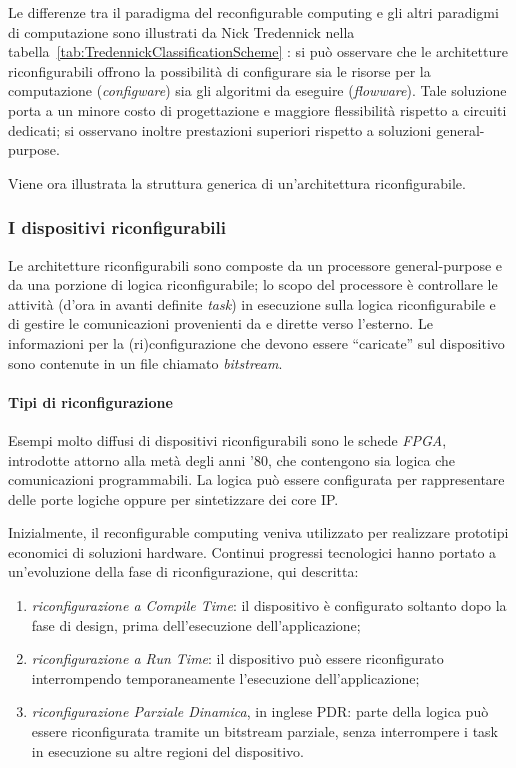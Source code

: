 Le differenze tra il paradigma del reconfigurable computing e gli altri paradigmi di
computazione sono illustrati da Nick Tredennick nella
tabella~\ref{tab:TredennickClassificationScheme} \cite{TredennickClassification}: si può
osservare che le architetture riconfigurabili offrono la possibilità di configurare sia le
risorse per la computazione (\emph{configware}) sia gli algoritmi da eseguire
(\emph{flowware}). Tale soluzione porta a un minore costo di progettazione e
maggiore flessibilità rispetto a circuiti dedicati; si osservano inoltre prestazioni
superiori rispetto a soluzioni general-purpose.

Viene ora illustrata la struttura generica di un'architettura riconfigurabile.

\subsubsection{I dispositivi riconfigurabili}
Le architetture riconfigurabili sono composte da un processore general-purpose e da una
porzione di logica riconfigurabile; lo scopo del processore è controllare le
attività (d'ora in avanti definite \emph{task}) in esecuzione sulla logica
riconfigurabile e di gestire le comunicazioni provenienti da e dirette verso l'esterno.
Le informazioni per la (ri)configurazione che devono essere ``caricate'' sul dispositivo
sono contenute in un file chiamato \emph{bitstream}.

\paragraph{Tipi di riconfigurazione}
Esempi molto diffusi di dispositivi riconfigurabili sono le schede \emph{\ac{FPGA}},
introdotte attorno alla metà degli anni '80, che contengono sia logica che comunicazioni
programmabili. La logica può essere configurata per rappresentare delle porte logiche
oppure per sintetizzare dei core \ac{IP}.

Inizialmente, il reconfigurable computing veniva utilizzato per realizzare prototipi
economici di soluzioni hardware. Continui progressi tecnologici hanno portato
a un'evoluzione della fase di riconfigurazione, qui descritta:
\begin{enumerate}
 \item \emph{riconfigurazione a Compile Time}: il dispositivo è configurato soltanto
dopo la fase di design, prima dell'esecuzione dell'applicazione;
 \item \emph{riconfigurazione a Run Time}: il dispositivo può essere riconfigurato
interrompendo temporaneamente l'esecuzione dell'applicazione;
 \item \emph{riconfigurazione Parziale Dinamica}, in inglese \ac{PDR}: parte della logica
può essere riconfigurata tramite un bitstream parziale, senza interrompere i task in
esecuzione su altre regioni del dispositivo.
\end{enumerate}

